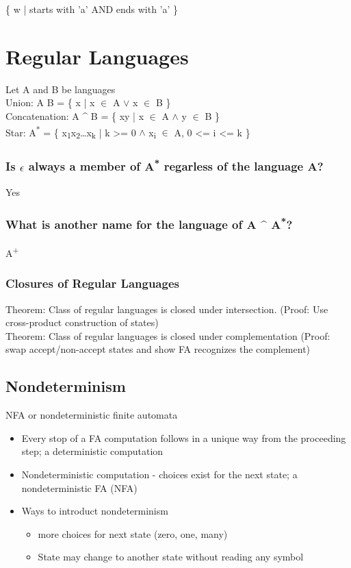 \documentclass[letterpaper, 12pt]{article}
\begin{document}
\{ w | starts with 'a' AND ends with 'a' \}\\
\section{Regular Languages}
\label{sec:orgca64fe1}
Let A and B be languages\\
Union: A \union B = \{ x | x \(\in\) A \(\vee\) x \(\in\) B \}\\
Concatenation: A \^{} B = \{ xy | x \(\in\) A \(\wedge\) y \(\in\) B \}\\
Star: A\textsuperscript{*} = \{ x\textsubscript{1}x\textsubscript{2}\ldots{}x\textsubscript{k} | k >= 0 \(\wedge\) x\textsubscript{i} \(\in\) A, 0 <= i <= k \}\\
\subsubsection{Is \(\epsilon\) always a member of A\textsuperscript{*} regarless of the language A?}
\label{sec:orgf81fd3b}
Yes\\
\subsubsection{What is another name for the language of A \^{} A\textsuperscript{*}?}
\label{sec:org62476f4}
A\textsuperscript{+}\\
\subsubsection{Closures of Regular Languages}
\label{sec:org34fe727}
Theorem: Class of regular languages is closed under intersection. (Proof: Use cross-product construction of states)\\
Theorem: Class of regular languages is closed under complementation (Proof: swap accept/non-accept states and show FA recognizes the complement)\\
\subsection{Nondeterminism}
\label{sec:orgc7b4b15}
NFA or nondeterministic finite automata\\
\begin{itemize}
\item Every stop of a FA computation follows in a unique way from the proceeding step; a deterministic computation\\
\item Nondeterministic computation - choices exist for the next state; a nondeterministic FA (NFA)\\
\item Ways to introduct nondeterminism\\
\begin{itemize}
\item more choices for next state (zero, one, many)\\
\item State may change to another state without reading any symbol\\
\end{itemize}
\end{itemize}
\end{document}
